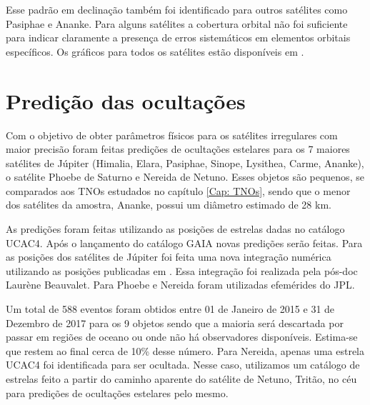 \documentclass[12pt,a4paper]{report}
\begin{document}
Esse padrão em declinação também foi identificado para outros satélites como Pasiphae e Ananke. Para alguns satélites a cobertura orbital não foi suficiente para indicar claramente a presença de erros sistemáticos em elementos orbitais específicos. Os gráficos para todos os satélites estão disponíveis em \cite{GomesJunior2015-Irregular}.



\section{Predição das ocultações}
\label{Sec: Irr-predic}

\indent \indent Com o objetivo de obter parâmetros físicos para os satélites irregulares com maior precisão foram feitas predições de ocultações estelares para os 7 maiores satélites de Júpiter (Himalia, Elara, Pasiphae, Sinope, Lysithea, Carme, Ananke), o satélite Phoebe de Saturno e Nereida de Netuno. Esses objetos são pequenos, se comparados aos TNOs estudados no capítulo \ref{Cap: TNOs}, sendo que o menor dos satélites da amostra, Ananke, possui um diâmetro estimado de 28 km.

As predições foram feitas utilizando as posições de estrelas dadas no catálogo UCAC4. Após o lançamento do catálogo GAIA novas predições serão feitas. Para as posições dos satélites de Júpiter foi feita uma nova integração numérica utilizando as posições publicadas em \cite{GomesJunior2015-Irregular}. Essa integração foi realizada pela pós-doc Laurène Beauvalet. Para Phoebe e Nereida foram utilizadas efemérides do JPL.

Um total de 588 eventos foram obtidos entre 01 de Janeiro de 2015 e 31 de Dezembro de 2017 para os 9 objetos sendo que a maioria será descartada por passar em regiões de oceano ou onde não há observadores disponíveis. Estima-se que restem ao final cerca de 10\% desse número. Para Nereida, apenas uma estrela UCAC4 foi identificada para ser ocultada. Nesse caso, utilizamos um catálogo de estrelas feito a partir do caminho aparente do satélite de Netuno, Tritão, no céu para predições de ocultações estelares pelo mesmo.
\end{document}
